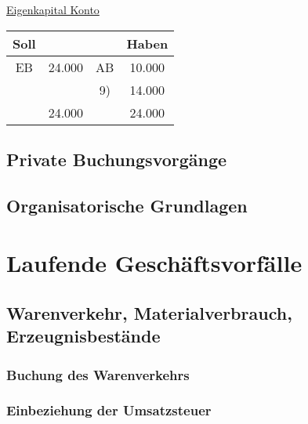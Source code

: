 \documentclass[paper=a4, fontsize=11pt]{scrartcl}
\numberwithin{equation}{section}
\numberwithin{figure}{section}
\numberwithin{table}{section}
\begin{document}
\underline{Eigenkapital Konto}

\begin{tabular}{cc|cc}
Soll & & & Haben \\
\hline
EB & 24.000 & AB & 10.000 \\
& & 9) & 14.000 \\
\hline
&24.000 && 24.000 \\
\end{tabular}


\subsection{Private Buchungsvorgänge}


\subsection{Organisatorische Grundlagen}


\newpage

\section{Laufende Geschäftsvorfälle}


\subsection{Warenverkehr, Materialverbrauch, Erzeugnisbestände}


\subsubsection{Buchung des Warenverkehrs}


\subsubsection{Einbeziehung der Umsatzsteuer}
\end{document}
